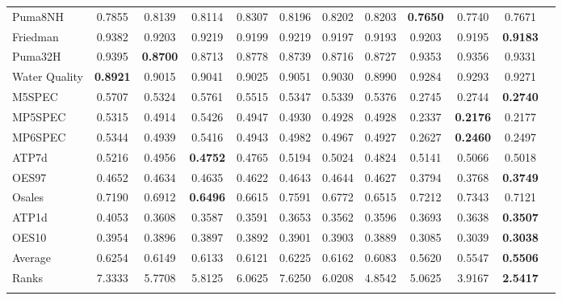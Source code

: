 \documentclass[reqno]{vcuthesis}
\numberwithin{equation}{chapter}
\begin{document}
\begin{table}[t!]
{\begin{tabular}{l@{\extracolsep{\fill}}ccccccccccc}
Puma8NH &0.7855 &0.8139 &0.8114 &0.8307 &0.8196 &0.8202 &0.8203 &\textbf{0.7650} &0.7740 &0.7671   \\
Friedman &0.9382 &0.9203 &0.9219 &0.9199 &0.9219 &0.9197 &0.9193 &0.9203 &0.9195 &\textbf{0.9183}   \\
Puma32H &0.9395 &\textbf{0.8700} &0.8713 &0.8778 &0.8739 &0.8716 &0.8727 &0.9353 &0.9356 &0.9331   \\
Water Quality &\textbf{0.8921} &0.9015 &0.9041 &0.9025 &0.9051 &0.9030 &0.8990 &0.9284 &0.9293 &0.9271   \\
M5SPEC &0.5707 &0.5324 &0.5761 &0.5515 &0.5347 &0.5339 &0.5376 &0.2745 &0.2744 &\textbf{0.2740}   \\
MP5SPEC &0.5315 &0.4914 &0.5426 &0.4947 &0.4930 &0.4928 &0.4928 &0.2337 &\textbf{0.2176} &0.2177   \\
MP6SPEC &0.5344 &0.4939 &0.5416 &0.4943 &0.4982 &0.4967 &0.4927 &0.2627 &\textbf{0.2460} &0.2497   \\
ATP7d &0.5216 &0.4956 &\textbf{0.4752} &0.4765 &0.5194 &0.5024 &0.4824 &0.5141 &0.5066 &0.5018   \\
OES97 &0.4652 &0.4634 &0.4635 &0.4622 &0.4643 &0.4644 &0.4627 &0.3794 &0.3768 &\textbf{0.3749}   \\
Osales &0.7190 &0.6912 &\textbf{0.6496} &0.6615 &0.7591 &0.6772 &0.6515 &0.7212 &0.7343 &0.7121   \\
ATP1d &0.4053 &0.3608 &0.3587 &0.3591 &0.3653 &0.3562 &0.3596 &0.3693 &0.3638 &\textbf{0.3507}   \\
OES10 &0.3954 &0.3896 &0.3897 &0.3892 &0.3901 &0.3903 &0.3889 &0.3085 &0.3039 &\textbf{0.3038}   \\
\noalign{\smallskip}\hline\noalign{\smallskip}
Average &0.6254 &0.6149 &0.6133 &0.6121 &0.6225 &0.6162 &0.6083 &0.5620 &0.5547 &\textbf{0.5506}   \\
Ranks &7.3333 &5.7708 &5.8125 &6.0625 &7.6250 &6.0208 &4.8542 &5.0625 &3.9167 &\textbf{2.5417}   \\
\noalign{\smallskip}\hline
\end{tabular}}
\centering \small
{}
\end{table}
\end{document}
